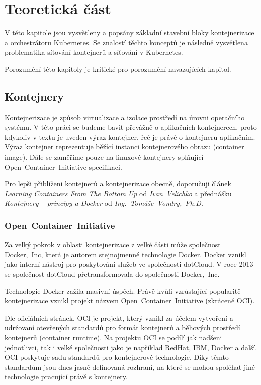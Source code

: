 \chapter{Teoretická část}
\begin{chapterabstract}
V této kapitole jsou vysvětleny a popsány základní stavební bloky kontejnerizace a orchestrátoru Kubernetes. Se znalostí těchto konceptů je následně vysvětlena problematika síťování kontejnerů a síťování v Kubernetes.  

Porozumění této kapitoly je kritické pro porozumění navazujících kapitol.
\end{chapterabstract}

\section{Kontejnery}
Kontejnerizace je způsob virtualizace a izolace prostředí na úrovni operačního systému. V této práci se budeme bavit převážně o aplikačních kontejnerech, proto kdykoliv v textu je uveden výraz kontejner, řeč je právě o kontejneru aplikačním. Výraz kontejner reprezentuje běžící instanci kontejnerového obrazu (container image). Dále se zaměříme pouze na linuxové kontejnery splňující Open~Container~Initiative specifikaci.

Pro lepši přiblíženi kontejnerů a kontejnerizace obecně, doporučuji článek \href{https://iximiuz.com/en/posts/container-learning-path/}{\textit{Learning Containers From The Bottom Up}} od \textit{Ivan~Velichko} a přednášku \textit{Kontejnery -- principy a Docker} od \textit{Ing.~Tomáše~Vondry,~Ph.D.}
\subsection{Open~Container~Initiative}
Za velký pokrok v oblasti kontejnerizace z velké části může společnost Docker,~Inc, která je autorem stejnojmenné technologie Docker. Docker vznikl jako interní nástroj pro poskytování služeb ve společnosti dotCloud. V roce 2013 se společnost dotCloud přetransformovala do společnosti Docker,~Inc. \cite{poulton_2020_docker}

Technologie Docker zažila masivní úspěch. Právě kvůli vzrůstající popularitě kontejnerizace vznikl projekt názvem Open~Container~Initiative (zkráceně OCI).

Dle oficiálních stránek, OCI je projekt, který vznikl za účelem vytvoření a udržovaní otevřených standardů pro formát kontejnerů a běhových prostředí kontejnerů (container runtime). Na projektu OCI se podílí jak nadšeni jednotlivci, tak i velké společnosti jako je například RedHat, IBM, Docker a další. OCI poskytuje sadu standardů pro kontejnerové technologie. Díky těmto standardům jsou dnes jasně definovaná rozhraní, na které se mohou spoléhat jiné technologie pracující právě s kontejnery. \cite{thelinuxfoundation_about}

